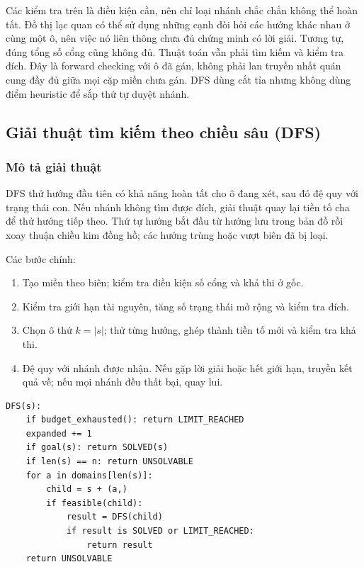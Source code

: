 Các kiểm tra trên là điều kiện cần, nên chỉ loại nhánh chắc chắn không thể
hoàn tất. Đồ thị lạc quan có thể sử dụng những cạnh đòi hỏi các hướng khác nhau
ở cùng một ô, nên việc nó liên thông chưa đủ chứng minh có lời giải. Tương tự,
đúng tổng số cổng cũng không đủ. Thuật toán vẫn phải tìm kiếm và kiểm tra đích.
Đây là forward checking với ô đã gán, không phải lan truyền nhất quán cung đầy
đủ giữa mọi cặp miền chưa gán. DFS dùng cắt tỉa nhưng không dùng điểm heuristic
để sắp thứ tự duyệt nhánh.

\subsection{Giải thuật tìm kiếm theo chiều sâu (DFS)}
\subsubsection{Mô tả giải thuật}

DFS thử hướng đầu tiên có khả năng hoàn tất cho ô đang xét, sau đó đệ quy với
trạng thái con. Nếu nhánh không tìm được đích, giải thuật quay lại tiền tố cha
để thử hướng tiếp theo. Thứ tự hướng bắt đầu từ hướng lưu trong bản đồ rồi
xoay thuận chiều kim đồng hồ; các hướng trùng hoặc vượt biên đã bị loại.

Các bước chính:
\begin{enumerate}
\item Tạo miền theo biên; kiểm tra điều kiện số cổng và khả thi ở gốc.
\item Kiểm tra giới hạn tài nguyên, tăng số trạng thái mở rộng và kiểm tra đích.
\item Chọn ô thứ $k=|s|$; thử từng hướng, ghép thành tiền tố mới và kiểm tra khả thi.
\item Đệ quy với nhánh được nhận. Nếu gặp lời giải hoặc hết giới hạn, truyền
      kết quả về; nếu mọi nhánh đều thất bại, quay lui.
\end{enumerate}

\begin{lstlisting}[caption={DFS trên cây gán hướng. Các miền đã loại hướng vượt biên.}]
DFS(s):
    if budget_exhausted(): return LIMIT_REACHED
    expanded += 1
    if goal(s): return SOLVED(s)
    if len(s) == n: return UNSOLVABLE
    for a in domains[len(s)]:
        child = s + (a,)
        if feasible(child):
            result = DFS(child)
            if result is SOLVED or LIMIT_REACHED:
                return result
    return UNSOLVABLE
\end{lstlisting}

